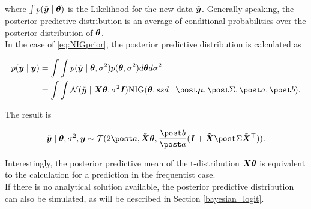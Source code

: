 where $\int p(\tilde{\bm{y}} \mid \bm{\theta})$ is the Likelihood for the new data $\tilde{\bm{y}}$. Generally speaking, the posterior predictive distribution is an average of conditional probabilities over the posterior distribution of $\bm{\theta}$.\\

In the case of \eqref{eq:NIGprior}, the posterior predictive distribution is calculated as 

\begin{equation*}
    \begin{aligned}
        p(\ty \mid \by) &= \int \int p(\ty \mid \btheta, \ssd) p(\btheta, \ssd) d \btheta d \ssd \\
        &= \int \int \Ncal(\ty \mid \bX \btheta, \ssd \bI) \text{NIG}(\btheta, ssd \mid \mupo, \Sdpo, \apo, \bpo).
    \end{aligned}
\end{equation*}

The result is

\begin{equation*}
    \ty \mid \btheta, \ssd, \by \sim \Tcal(2 \apo, \tX \btheta, \frac{\bpo}{\apo} (\bI + \tX \Sdpo \tX^\top)).
\end{equation*}

Interestingly, the posterior predictive mean of the t-distribution $\tilde{\bm{X}} \bm{\theta}$ is equivalent to the calculation for a prediction in the frequentist case.\\

If there is no analytical solution available, the posterior predictive distribution can also be simulated, as will be described in Section \ref{bayesian_logit}.
